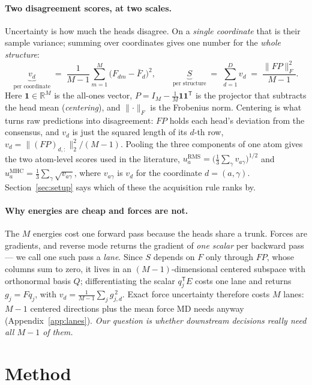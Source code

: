 \documentclass{article}
\begin{document}
\paragraph{Two disagreement scores, at two scales.}
Uncertainty is how much the heads disagree. On a \emph{single coordinate} that is their sample
variance; summing over coordinates gives one number for the \emph{whole structure}:
\begin{equation}
\underbrace{v_d}_{\text{per coordinate}}\;=\;\frac{1}{M-1}\sum_{m=1}^{M}\bigl(F_{dm}-\bar F_d\bigr)^2 ,
\qquad
\underbrace{S}_{\text{per structure}}\;=\;\sum_{d=1}^{D} v_d\;=\;\frac{\lVert FP\rVert_F^2}{M-1} .
\end{equation}
Here $\mathbf 1\in\mathbb{R}^{M}$ is the all-ones vector,
$P=I_M-\tfrac{1}{M}\mathbf 1\mathbf 1^{\mathsf T}$ is the projector that subtracts the head mean
(\emph{centering}), and $\lVert\cdot\rVert_F$ is the Frobenius norm. Centering is what turns raw
predictions into disagreement: $FP$ holds each head's deviation from the consensus, and $v_d$ is
just the squared length of its $d$-th row, $v_d=\lVert (FP)_{d,:}\rVert_2^2/(M-1)$. Pooling the
three components of one atom gives the two atom-level scores used in the literature,
$u_a^{\mathrm{RMS}}=\bigl(\tfrac13\sum_{\gamma}v_{a\gamma}\bigr)^{1/2}$ and
$u_a^{\mathrm{MHC}}=\tfrac13\sum_{\gamma}\sqrt{v_{a\gamma}}$, where $v_{a\gamma}$ is $v_d$ for the
coordinate $d=(a,\gamma)$. Section~\ref{sec:setup} says which of these the acquisition rule ranks by.

\paragraph{Why energies are cheap and forces are not.}
The $M$ energies cost one forward pass because the heads share a trunk. Forces are gradients, and
reverse mode returns the gradient of \emph{one scalar} per backward pass --- we call one such pass a
\emph{lane}. Since $S$ depends on $F$ only through $FP$, whose columns sum to zero, it lives in an
$(M{-}1)$-dimensional centered subspace with orthonormal basis $Q$; differentiating the scalar
$q_j^{\mathsf T}E$ costs one lane and returns $g_j=Fq_j$, with
$v_d=\frac{1}{M-1}\sum_j g_{j,d}^{\,2}$. Exact force uncertainty therefore costs $M$ lanes: $M{-}1$
centered directions plus the mean force MD needs anyway (Appendix~\ref{app:lanes}). \emph{Our
question is whether downstream decisions really need all $M-1$ of them.}

\section{Method}
\label{sec:method}
\end{document}
